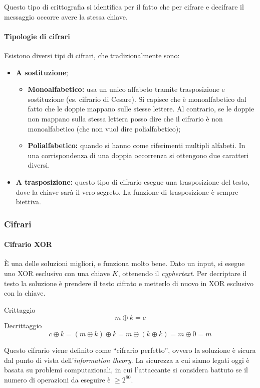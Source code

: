 Questo tipo di crittografia si identifica per il fatto che per cifrare e 
decifrare il messaggio occorre avere la stessa chiave.

\paragraph*{Tipologie di cifrari} Esistono diversi tipi di cifrari, che 
tradizionalmente sono:
\begin{itemize}
 \item \textbf{A sostituzione};
 \begin{itemize}
  \item \textbf{Monoalfabetico:} usa un unico alfabeto tramite trasposizione e 
sostituzione (es. cifrario di Cesare). Si capisce che è monoalfabetico dal fatto 
che le doppie mappano sulle stesse lettere.
Al contrario, se le doppie non mappano sulla stessa lettera posso dire che il 
cifrario è non monoalfabetico (che non vuol dire polialfabetico);
  \item \textbf{Polialfabetico:} quando si hanno come riferimenti multipli alfabeti.
 In una corrispondenza di una doppia occorrenza si ottengono due caratteri diversi.
 \end{itemize}
 \item \textbf{A trasposizione:} questo tipo di cifrario esegue una trasposizione del testo, dove la chiave sarà 
il vero segreto. La funzione di trasposizione è sempre biettiva. 
\end{itemize}

\subsubsection{Cifrari}

\paragraph{Cifrario XOR}

È una delle soluzioni migliori, e funziona molto bene. Dato un input, si esegue 
uno XOR esclusivo con una chiave $K$, ottenendo il \textit{cyphertext}. Per 
decriptare il testo la soluzione è prendere il testo cifrato e metterlo di nuovo 
in XOR esclusivo con la chiave.

Crittaggio
$$
m \oplus k = c
$$
\indent Decrittaggio
$$
c \oplus k = (m \oplus k) \oplus k = m \oplus (k \oplus k) = m \oplus 0 = m
$$

Questo cifrario viene definito come ``cifrario perfetto'', ovvero la soluzione è 
sicura dal punto di vista dell'\textit{information theory}. La sicurezza a cui 
siamo legati oggi è basata su problemi computazionali, in cui l'attaccante si 
considera battuto se il numero di operazioni da eseguire è $\ge 2^{80}$.

